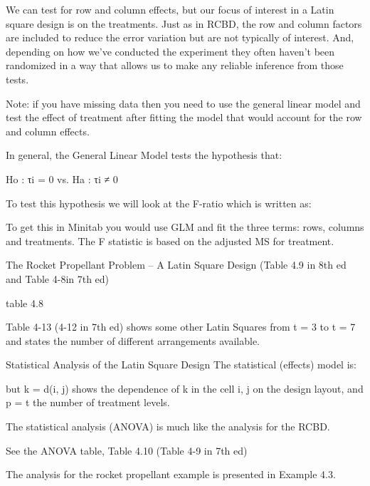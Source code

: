 \documentclass[]{article}
\begin{document}
We can test for row and column effects, but our focus of interest in a Latin square design is on the treatments. Just as in RCBD, the row and column factors are included to reduce the error variation but are not typically of interest. And, depending on how we've conducted the experiment they often haven't been randomized in a way that allows us to make any reliable inference from those tests.

Note: if you have missing data then you need to use the general linear model and test the effect of treatment after fitting the model that would account for the row and column effects.


In general, the General Linear Model tests the hypothesis that:

Ho : τi = 0   vs.   Ha : τi ≠ 0

To test this hypothesis we will look at the F-ratio which is written as:


To get this in Minitab you would use GLM and fit the three terms: rows, columns and treatments. The F statistic is based on the adjusted MS for treatment.

The Rocket Propellant Problem – A Latin Square Design (Table 4.9 in 8th ed and Table 4-8in 7th ed)

table 4.8

Table 4-13 (4-12 in 7th ed) shows some other Latin Squares from t = 3 to t = 7 and states the number of different arrangements available.

Statistical Analysis of the Latin Square Design
The statistical (effects) model is:


but k = d(i, j) shows the dependence of k in the cell i, j on the design layout, and p = t the number of treatment levels.

The statistical analysis (ANOVA) is much like the analysis for the RCBD.

See the ANOVA table, Table 4.10 (Table 4-9 in 7th ed)

The analysis for the rocket propellant example is presented in Example 4.3.
\end{document}
